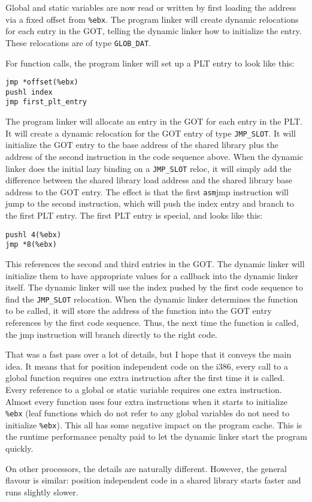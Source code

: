 Global and static variables are now read or written by first loading
the address via a fixed offset from \texttt{\%ebx}. The program linker will
create dynamic relocations for each entry in the GOT, telling the dynamic
linker how to initialize the entry. These relocations are of type
\texttt{GLOB\_DAT}\@.

For function calls, the program linker will set up a PLT entry to look
like this:

\begin{lstlisting}
jmp *offset(%ebx)
pushl index
jmp first_plt_entry
\end{lstlisting}

The program linker will allocate an entry in the GOT for each entry
in the PLT\@. It will create a dynamic relocation for the GOT entry
of type \texttt{JMP\_SLOT}\@. It will initialize the GOT entry to the
base address of the shared library plus the address of the second
instruction in the code sequence above. When the dynamic linker does
the initial lazy binding on a \texttt{JMP\_SLOT} reloc, it will simply add
the difference between the shared library load address and the shared
library base address to the GOT entry. The effect is that the first
\texttt{asm}{jmp} instruction will jump to the second instruction,
which will push the index entry and branch to the first PLT entry. The
first PLT entry is special, and looks like this:

\begin{lstlisting}
pushl 4(%ebx)
jmp *8(%ebx)
\end{lstlisting}

This references the second and third entries in the GOT\@. The dynamic
linker will initialize them to have appropriate values for a callback
into the dynamic linker itself. The dynamic linker will use the
index pushed by the first code sequence to find the \texttt{JMP\_SLOT}
relocation. When the dynamic linker determines the function to be
called, it will store the address of the function into the GOT entry
references by the first code sequence. Thus, the next time the function
is called, the jmp instruction will branch directly to the right code.

That was a fast pass over a lot of details, but I hope that it conveys
the main idea. It means that for position independent code on the i386,
every call to a global function requires one extra instruction after the
first time it is called. Every reference to a global or static variable
requires one extra instruction. Almost every function uses four extra
instructions when it starts to initialize \texttt{\%ebx} (leaf
functions which do not refer to any global variables do not need to
initialize \texttt{\%ebx}). This all has some negative impact on
the program cache. This is the runtime performance penalty paid to let
the dynamic linker start the program quickly.

On other processors, the details are naturally different. However,
the general flavour is similar: position independent code in a shared
library starts faster and runs slightly slower.

